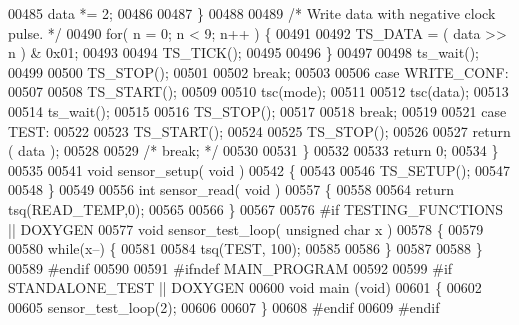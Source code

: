 \begin{DoxyCode}
00485         data *= 2;
00486 
00487       \}
00488 
00489       \textcolor{comment}{/* Write data with negative clock pulse. */}
00490       \textcolor{keywordflow}{for}( n = 0; n < 9; n++ ) \{
00491 
00492         TS_DATA = ( data >> n ) & 0x01;
00493 
00494         TS_TICK();
00495 
00496       \}
00497 
00498       ts_wait();
00499 
00500       TS_STOP();
00501 
00502       \textcolor{keywordflow}{break};
00503 
00506     \textcolor{keywordflow}{case} WRITE_CONF:
00507 
00508       TS_START();
00509 
00510       tsc(mode);
00511 
00512       tsc(data); 
00513 
00514       ts_wait();
00515 
00516       TS_STOP();
00517 
00518       \textcolor{keywordflow}{break};
00519 
00521     \textcolor{keywordflow}{case} TEST:
00522 
00523         TS_START();
00524 
00525         TS_STOP();
00526 
00527         \textcolor{keywordflow}{return} ( data );
00528 
00529         \textcolor{comment}{/* break; */}
00530 
00531   \}
00532 
00533   \textcolor{keywordflow}{return} 0;
00534 \}
00535 
00541 \textcolor{keywordtype}{void} sensor_setup( \textcolor{keywordtype}{void} )
00542 \{
00543 
00546   TS_SETUP();
00547 
00548 \}
00549 
00556 \textcolor{keywordtype}{int} sensor_read( \textcolor{keywordtype}{void} )
00557 \{
00558 
00564   \textcolor{keywordflow}{return} tsq(READ_TEMP,0);
00565 
00566 \}
00567 
00576 \textcolor{preprocessor}{#if TESTING\_FUNCTIONS || DOXYGEN}
00577 \textcolor{preprocessor}{}\textcolor{keywordtype}{void} sensor_test_loop( \textcolor{keywordtype}{unsigned} \textcolor{keywordtype}{char} x )
00578 \{
00579 
00580   \textcolor{keywordflow}{while}(x--) \{
00581 
00584     tsq(TEST, 100);
00585 
00586   \}
00587 
00588 \}
00589 \textcolor{preprocessor}{#endif}
00590 \textcolor{preprocessor}{}
00591 \textcolor{preprocessor}{#ifndef MAIN\_PROGRAM}
00592 \textcolor{preprocessor}{}
00599 \textcolor{preprocessor}{#if STANDALONE\_TEST || DOXYGEN}
00600 \textcolor{preprocessor}{}\textcolor{keywordtype}{void} main (\textcolor{keywordtype}{void})
00601 \{
00602 
00605   sensor_test_loop(2);
00606 
00607 \}
00608 \textcolor{preprocessor}{#endif}
00609 \textcolor{preprocessor}{}\textcolor{preprocessor}{#endif}
\end{DoxyCode}

